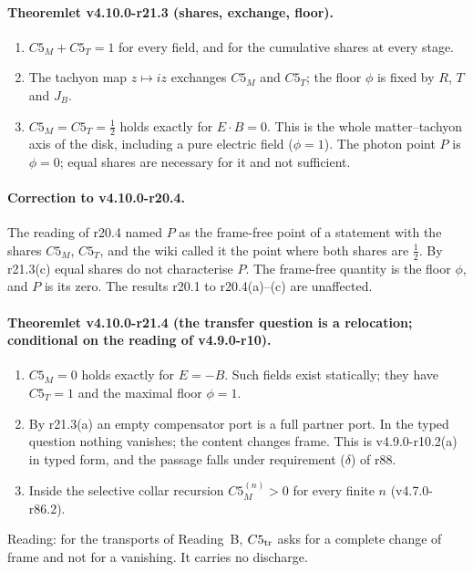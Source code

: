 \paragraph{Theoremlet v4.10.0-r21.3 (shares, exchange, floor).}
\begin{enumerate}[leftmargin=2em]
\item[(a)] \(C5_M+C5_T=1\) for every field, and for the cumulative shares at every stage.
\item[(b)] The tachyon map \(z\mapsto iz\) exchanges \(C5_M\) and \(C5_T\); the floor \(\phi\) is fixed by \(R\), \(T\) and \(J_B\).
\item[(c)] \(C5_M=C5_T=\tfrac12\) holds exactly for \(E\cdot B=0\).  This is the whole matter--tachyon axis of the disk, including a pure
electric field (\(\phi=1\)).  The photon point \(P\) is \(\phi=0\); equal shares are necessary for it and not sufficient.
\end{enumerate}

\paragraph{Correction to v4.10.0-r20.4.}
The reading of r20.4 named \(P\) as the frame-free point of a statement with the shares \(C5_M\), \(C5_T\), and the wiki called it the point
where both shares are \(\tfrac12\).  By r21.3(c) equal shares do not characterise \(P\).  The frame-free quantity is the floor \(\phi\), and
\(P\) is its zero.  The results r20.1 to r20.4(a)--(c) are unaffected.

\paragraph{Theoremlet v4.10.0-r21.4 (the transfer question is a relocation; conditional on the reading of v4.9.0-r10).}
\begin{enumerate}[leftmargin=2em]
\item[(a)] \(C5_M=0\) holds exactly for \(E=-B\).  Such fields exist statically; they have \(C5_T=1\) and the maximal floor \(\phi=1\).
\item[(b)] By r21.3(a) an empty compensator port is a full partner port.  In the typed question nothing vanishes; the content changes
frame.  This is v4.9.0-r10.2(a) in typed form, and the passage falls under requirement (\(\delta\)) of r88.
\item[(c)] Inside the selective collar recursion \(C5_M^{(n)}>0\) for every finite \(n\) (v4.7.0-r86.2).
\end{enumerate}
Reading: for the transports of Reading~B, \(C5_{\rm tr}\) asks for a complete change of frame and not for a vanishing.  It carries no
discharge.

